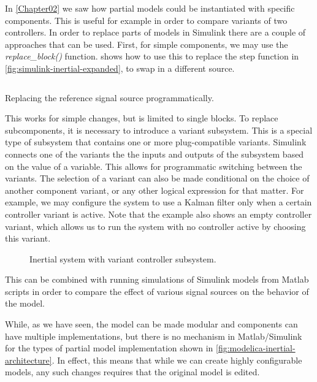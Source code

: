 \documentclass[\rootfolder/main.tex]{subfiles}
\begin{document}
In \cref{Chapter02} we saw how partial models could be instantiated with specific components.
This is useful for example in order to compare variants of two controllers.
In order to replace parts of models in Simulink there are a couple of approaches that can be used.
First, for simple components, we may use the \emph{replace\_block()} function.
 shows how to use this to replace the step function in \cref{fig:simulink-inertial-expanded}, to swap in a different source.

\begin{listing}[ht]
    \inputminted[fontsize=\footnotesize, firstline=1, lastline=4]{matlab}{\rootfolder/Models/Matlab/ReplaceSource.m}
    \caption{Replacing the reference signal source programmatically.\label{lst:matlab-replace}}
\end{listing}

This works for simple changes, but is limited to single blocks.
To replace subcomponents, it is necessary to introduce a variant subsystem.
This is a special type of subsystem that contains one or more plug-compatible variants.
Simulink connects one of the variants the the inputs and outputs of the subsystem based on the value of a variable.
This allows for programmatic switching between the variants.
The selection of a variant can also be made conditional on the choice of another component variant, or any other logical expression for that matter.
For example, we may configure the system to use a Kalman filter only when a certain controller variant is active.
Note that the example also shows an empty controller variant, which allows us to run the system with no controller active by choosing this variant.

\begin{figure}[ht]
    \caption{Inertial system with variant controller subsystem.\label{fig:simscape-inertial-blowup}}
\end{figure}

This can be combined with running simulations of Simulink models from Matlab scripts in order to compare the effect of various signal sources on the behavior of the model.

While, as we have seen, the model can be made modular and components can have multiple implementations, but there is no mechanism in Matlab/Simulink for
the types of partial model implementation shown in \cref{fig:modelica-inertial-architecture}.
In effect, this means that while we can create highly configurable models, any such changes requires that the original model is edited.
\end{document}
